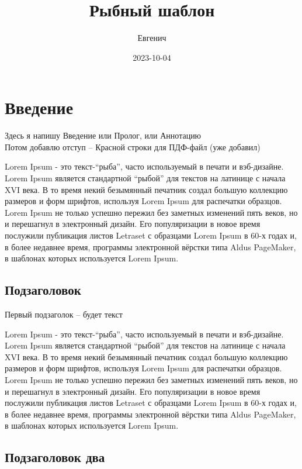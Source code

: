 \documentclass[
  12pt,
  a4paper,
]{book}
\title{Рыбный шаблон}
\author{Евгенич}
\date{2023-10-04}
\theoremstyle{definition}
\theoremstyle{definition}
\theoremstyle{definition}
\theoremstyle{definition}
\theoremstyle{remark}
\begin{document}
\maketitle

{
\setcounter{tocdepth}{1}
\tableofcontents
}
\chapter{Введение}\label{index}

Здесь я напишу Введение или Пролог, или Аннотацию\\
Потом добавлю отступ -- Красной строки для ПДФ-файл (уже добавил)

Lorem Ipsum - это текст-``рыба'', часто используемый в печати и вэб-дизайне. Lorem Ipsum является стандартной ``рыбой'' для текстов на латинице с начала XVI века. В то время некий безымянный печатник создал большую коллекцию размеров и форм шрифтов, используя Lorem Ipsum для распечатки образцов. Lorem Ipsum не только успешно пережил без заметных изменений пять веков, но и перешагнул в электронный дизайн. Его популяризации в новое время послужили публикация листов Letraset с образцами Lorem Ipsum в 60-х годах и, в более недавнее время, программы электронной вёрстки типа Aldus PageMaker, в шаблонах которых используется Lorem Ipsum.

\section{Подзаголовок}\label{ux43fux43eux434ux437ux430ux433ux43eux43bux43eux432ux43eux43a}

Первый подзаголок -- будет текст

Lorem Ipsum - это текст-``рыба'', часто используемый в печати и вэб-дизайне. Lorem Ipsum является стандартной ``рыбой'' для текстов на латинице с начала XVI века. В то время некий безымянный печатник создал большую коллекцию размеров и форм шрифтов, используя Lorem Ipsum для распечатки образцов. Lorem Ipsum не только успешно пережил без заметных изменений пять веков, но и перешагнул в электронный дизайн. Его популяризации в новое время послужили публикация листов Letraset с образцами Lorem Ipsum в 60-х годах и, в более недавнее время, программы электронной вёрстки типа Aldus PageMaker, в шаблонах которых используется Lorem Ipsum.

\section{Подзаголовок два}\label{ux43fux43eux434ux437ux430ux433ux43eux43bux43eux432ux43eux43a-ux434ux432ux430}
\end{document}
